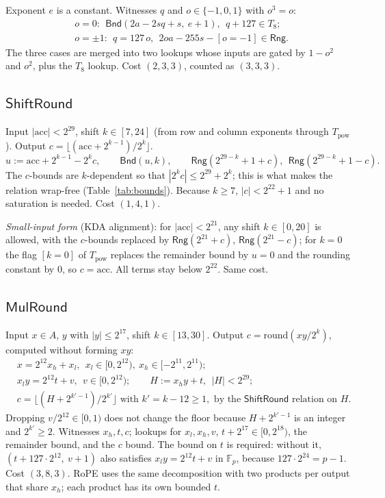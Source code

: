 \documentclass[11pt]{article}
\newcommand{\F}{\mathbb{F}}
\newcommand{\Rng}{\mathsf{Rng}}
\newcommand{\Bnd}{\mathsf{Bnd}}
\newcommand{\Fp}{\F_p}
\begin{document}
Exponent \(e\) is a constant.
Witnesses \(q\) and \(o \in \{-1, 0, 1\}\) with \(o^3 = o\):
\begin{align*}
& o = 0:\ \ \Bnd(2a - 2sq + s,\ e+1),\ \ q + 127 \in T_8;\\
& o = \pm 1:\ \ q = 127\,o,\ \ 2 o a - 255 s - [o = -1] \in \Rng.
\end{align*}
The three cases are merged into two lookups whose inputs are gated by \(1 - o^2\) and \(o^2\), plus the \(T_8\) lookup.
Cost \((2, 3, 3)\), counted as \((3,3,3)\).

\subsection{\texorpdfstring{\(\mathsf{ShiftRound}\)}{ShiftRound}}
\label{sec:g-sr}

Input \(|\mathrm{acc}| < 2^{29}\), shift \(k \in [7, 24]\) (from row and column exponents through \(T_{\mathrm{pow}}\)).
Output \(c = \lfloor (\mathrm{acc} + 2^{k-1}) / 2^k \rfloor\).
\[
u := \mathrm{acc} + 2^{k-1} - 2^k c,\qquad \Bnd(u, k),\qquad \Rng(2^{29-k} + 1 + c),\ \ \Rng(2^{29-k} + 1 - c).
\]
The \(c\)-bounds are \(k\)-dependent so that \(|2^k c| \le 2^{29} + 2^{k}\); this is what makes the relation wrap-free (Table~\ref{tab:bounds}).
Because \(k \ge 7\), \(|c| < 2^{22}+1\) and no saturation is needed.
Cost \((1, 4, 1)\).

\emph{Small-input form} (KDA alignment): for \(|\mathrm{acc}| < 2^{21}\), any shift \(k \in [0, 20]\) is allowed, with the \(c\)-bounds replaced by \(\Rng(2^{21} + c)\), \(\Rng(2^{21} - c)\); for \(k = 0\) the flag \([k = 0]\) of \(T_{\mathrm{pow}}\) replaces the remainder bound by \(u = 0\) and the rounding constant by \(0\), so \(c = \mathrm{acc}\).
All terms stay below \(2^{22}\). Same cost.

\subsection{\texorpdfstring{\(\mathsf{MulRound}\)}{MulRound}}
\label{sec:g-mul}

Input \(x \in A\), \(y\) with \(|y| \le 2^{17}\), shift \(k \in [13, 30]\).
Output \(c = \mathrm{round}(xy/2^k)\), computed without forming \(xy\):
\begin{align*}
& x = 2^{12} x_h + x_l,\ \ x_l \in [0, 2^{12}),\ x_h \in [-2^{11}, 2^{11});\\
& x_l y = 2^{12} t + v,\ \ v \in [0, 2^{12});\qquad H := x_h y + t,\ \ |H| < 2^{29};\\
& c = \lfloor (H + 2^{k'-1}) / 2^{k'} \rfloor \text{ with } k' = k - 12 \ge 1, \text{ by the } \mathsf{ShiftRound} \text{ relation on } H.
\end{align*}
Dropping \(v/2^{12} \in [0,1)\) does not change the floor because \(H + 2^{k'-1}\) is an integer and \(2^{k'} \ge 2\).
Witnesses \(x_h, t, c\); lookups for \(x_l, x_h, v\), \(t + 2^{17} \in [0, 2^{18})\), the remainder bound, and the \(c\) bound.
The bound on \(t\) is required: without it, \((t + 127\cdot 2^{12},\ v + 1)\) also satisfies \(x_l y = 2^{12} t + v\) in \(\Fp\), because \(127 \cdot 2^{24} = p - 1\).
Cost \((3, 8, 3)\).
RoPE uses the same decomposition with two products per output that share \(x_h\); each product has its own bounded \(t\).
\end{document}
